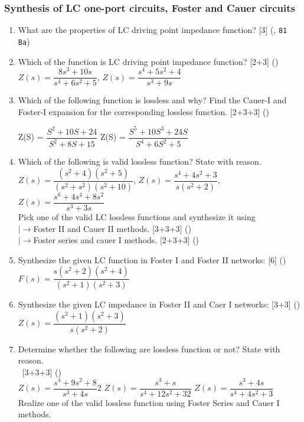 \documentclass[12pt]{article}
\newcommand{\lb}{\\$\left|\rightarrow\right.$}
\newcommand{\enter}{\\\textcolor{white}{1}}
\begin{document}
		\subsubsection{Synthesis of LC one-port circuits, Foster and Cauer circuits}
			\begin{enumerate}
				\item What are the properties of LC driving point impedance function? \hfill [3] (, \texttt{81 Ba})
				
				\item Which of the function is LC driving point impedance function? \hfill [2+3] ()\\
				$Z(s) = \dfrac{8s^3+10s}{s^4+6s^2+5}$, \hspace{1cm} $Z(s) = \dfrac{s^4+5s^2+4}{s^3+9s}$

				\item Which of the following function is lossless and why? Find the Cauer-I and Foster-I expansion for the corresponding lossless function. \hfill [2+3+3] ()
				
					Z(S) = $\dfrac{S^2+10S+24}{S^2+8S+15}$\hspace{2cm}
					Z(S) = $\dfrac{S^5+10S^3+24S}{S^4+6S^2+5}$

				\item Which of the following is valid lossless function? State with reason. \\
				$Z(s) = \dfrac{(s^2+4)(s^2+5)}{(s^2+s^2)(s^2+10)}$, \hspace{1cm} $Z(s)= \dfrac{s^4+4s^2+3}{s(s^2+2)}$, \hspace{1cm} $Z(s) = \dfrac{s^6+4s^4+8s^2}{s^3+3s}$\\
				Pick one of the valid LC lossless functions and synthesize it using
				\lb Foster II and Cauer II methods. \hfill [3+3+3] ()
				\lb Foster series and cauer I methods. \hfill [2+3+3] ()

				\item Synthesize the given LC function in Foster I and Foster II networks: \hfill [6] ()\\
				$F(s) = \dfrac{s(s^2+2)(s^2+4)}{(s^2+1)(s^2+3)}$
				
				\item Synthesize the given LC impedance in Foster II and Caer I networks: \hfill [3+3] ()\\
				$Z(s) = \dfrac{(s^2+1)(s^2+3)}{s(s^2+2)}$
				
				\item Determine whether the following are lossless function or not? State with reason. 
				\enter\hfill [3+3+3] ()\\
				$Z(s) = \dfrac{s^4+9s^2+8}{s^3+4s}2$ \hspace{1cm}
				$Z(s) = \dfrac{s^3+s}{s^4+12s^2+32}$ \hspace{1cm}
				$Z(s) = \dfrac{s^3+4s}{s^4+4s^2+3}$\\
				Realize one of the valid lossless function using Foster Series and Cauer I methods.
				

\end{enumerate}
\end{document}
